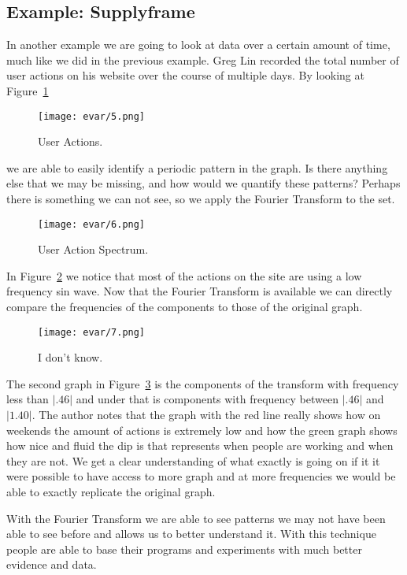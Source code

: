 \documentclass [../article.tex]{subfiles}
\begin{document}
  \subsection{Example: Supplyframe}
  In another example we are going to look at data over a certain
  amount of time, much like we did in the previous example.
  Greg Lin recorded the total number of
  user actions on his website over the course of multiple days.
  By looking at Figure~\ref{fig:useractions}
  \begin{figure}[htbp]
    \centering
    \texttt{[image: evar/5.png]}
    \caption{User Actions.}
    \label{fig:useractions}
  \end{figure}
  we are able to easily identify a periodic pattern in
  the graph. Is there anything else that we may be missing, and
  how would we quantify these patterns?
  Perhaps there is something we can not see, so we apply the
  Fourier Transform to the set.
  \begin{figure}[htbp]
    \centering
    \texttt{[image: evar/6.png]}
    \caption{User Action Spectrum.}
    \label{fig:actionspectrum}
  \end{figure}
  In Figure~\ref{fig:actionspectrum} we notice that most of the actions
  on the site are using a low frequency sin wave. Now that the Fourier
  Transform is available we can directly compare the frequencies of the
  components to those of the original graph.
  \begin{figure}[htbp]
    \centering
    \texttt{[image: evar/7.png]}
    \caption{I don't know.}
    \label{fig:idk}
  \end{figure}
  The second graph in Figure~\ref{fig:idk} is the components of the
  transform with frequency less than $|.46|$ and under that is
  components with frequency between $|.46|$ and $|1.40|$.  The author
  notes that  the graph with the red line really shows how on
  weekends the amount of actions is extremely low and how the
  green graph shows how nice and fluid the dip is that represents
  when people are working and when they are not. We get a clear
  understanding of what exactly is going on if it it were possible
  to have access to more graph and at more frequencies we would be
  able to exactly replicate the original graph.

  With the Fourier Transform we are able to see patterns we may not
  have been able to see before and allows us to better
  understand it. With this technique people are able to
  base their programs and experiments with much better evidence
  and data.
\end{document}
